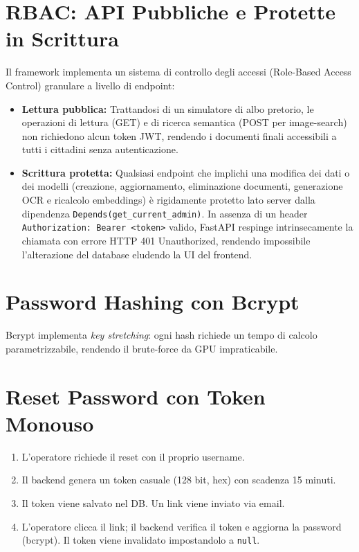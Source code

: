 \documentclass[12pt,a4paper,oneside]{report}
\begin{document}
\section{RBAC: API Pubbliche e Protette in Scrittura}
Il framework implementa un sistema di controllo degli accessi (Role-Based Access Control) granulare a livello di endpoint:
\begin{itemize}
    \item \textbf{Lettura pubblica:} Trattandosi di un simulatore di albo pretorio, le operazioni di lettura (GET) e di ricerca semantica (POST per image-search) non richiedono alcun token JWT, rendendo i documenti finali accessibili a tutti i cittadini senza autenticazione.
    \item \textbf{Scrittura protetta:} Qualsiasi endpoint che implichi una modifica dei dati o dei modelli (creazione, aggiornamento, eliminazione documenti, generazione OCR e ricalcolo embeddings) \`e rigidamente protetto lato server dalla dipendenza \texttt{Depends(get\_current\_admin)}. In assenza di un header \texttt{Authorization: Bearer <token>} valido, FastAPI respinge intrinsecamente la chiamata con errore HTTP 401 Unauthorized, rendendo impossibile l'alterazione del database eludendo la UI del frontend.
\end{itemize}

\section{Password Hashing con Bcrypt}

Bcrypt implementa \textit{key stretching}: ogni hash richiede un tempo di calcolo
parametrizzabile, rendendo il brute-force da GPU impraticabile.

\section{Reset Password con Token Monouso}

\begin{enumerate}
    \item L'operatore richiede il reset con il proprio username.
    \item Il backend genera un token casuale (128 bit, hex) con scadenza 15 minuti.
    \item Il token viene salvato nel DB. Un link viene inviato via email.
    \item L'operatore clicca il link; il backend verifica il token e aggiorna la password
          (bcrypt). Il token viene invalidato impostandolo a \texttt{null}.
\end{enumerate}
\end{document}
